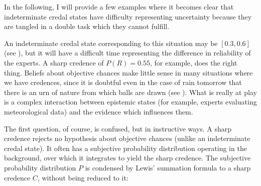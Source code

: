 In the following, I will provide a few examples where
it becomes clear that indeterminate credal states have
difficulty representing uncertainty because they are
tangled in a double task which they cannot fulfill.


An indeterminate credal state corresponding to this
situation may be $[0.3,0.6]$ (see
), but it will have a difficult
time representing the difference in reliability of the
experts. A sharp credence of $P(R)=0.55$, for example,
does the right thing. Beliefs about objective chances
make little sense in many situations where we have
credences, since it is doubtful even in the case of
rain tomorrow that there is an urn of nature from which
balls are drawn (see ). What is
really at play is a complex interaction between
epistemic states (for example, experts evaluating
meteorological data) and the evidence which influences
them.


The first question, of course, is confused, but in
instructive ways. A sharp credence rejects no
hypothesis about objective chances (unlike an
indeterminate credal state). It often has a subjective
probability distribution operating in the background,
over which it integrates to yield the sharp credence.
The subjective probability distribution $P$ is
condensed by Lewis' summation formula to a sharp
credence $C$, without being reduced to it:

